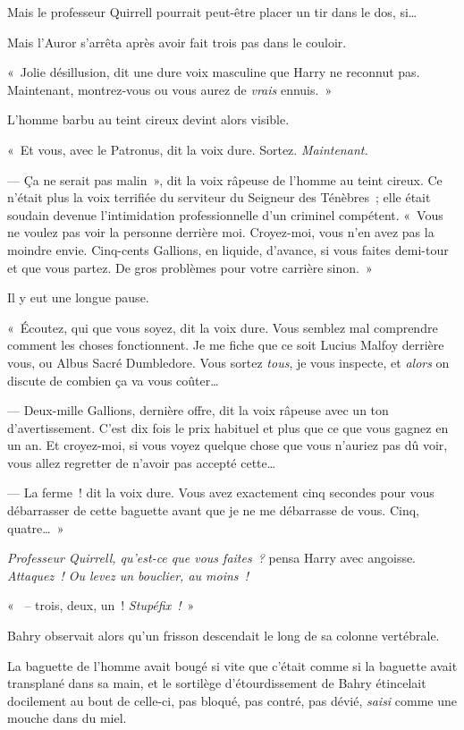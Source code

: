 Mais le professeur Quirrell pourrait peut-être placer un tir dans le dos, si…

Mais l'Auror s'arrêta après avoir fait trois pas dans le couloir.

«~Jolie désillusion, dit une dure voix masculine que Harry ne reconnut pas.
Maintenant, montrez-vous ou vous aurez de \emph{vrais} ennuis.~»

L'homme barbu au teint cireux devint alors visible.

«~Et vous, avec le Patronus, dit la voix dure.
Sortez. \emph{Maintenant.}

--- Ça ne serait pas malin~», dit la voix râpeuse de l'homme au teint cireux.
Ce n'était plus la voix terrifiée du serviteur du Seigneur des Ténèbres~; elle était soudain devenue l'intimidation professionnelle d'un criminel compétent.
«~Vous ne voulez pas voir la personne derrière moi.
Croyez-moi, vous n'en avez pas la moindre envie.
Cinq-cents Gallions, en liquide, d'avance, si vous faites demi-tour et que vous partez.
De gros problèmes pour votre carrière sinon.~»

Il y eut une longue pause.

«~Écoutez, qui que vous soyez, dit la voix dure.
Vous semblez mal comprendre comment les choses fonctionnent.
Je me fiche que ce soit Lucius Malfoy derrière vous, ou Albus Sacré Dumbledore.
Vous sortez \emph{tous}, je vous inspecte, et \emph{alors} on discute de combien ça va vous coûter…

--- Deux-mille Gallions, dernière offre, dit la voix râpeuse avec un ton d'avertissement.
C'est dix fois le prix habituel et plus que ce que vous gagnez en un an.
Et croyez-moi, si vous voyez quelque chose que vous n'auriez pas dû voir, vous allez regretter de n'avoir pas accepté cette…

--- La ferme~! dit la voix dure.
Vous avez exactement cinq secondes pour vous débarrasser de cette baguette avant que je ne me débarrasse de vous.
Cinq, quatre…~»

\emph{Professeur Quirrell, qu'est-ce que vous faites~?} pensa Harry avec angoisse.
\emph{Attaquez~!
Ou levez un bouclier, au moins~!}

«~ -- trois, deux, un~!
\emph{Stupéfix~!}~»

\later

Bahry observait alors qu'un frisson descendait le long de sa colonne vertébrale.

La baguette de l'homme avait bougé si vite que c'était comme si la baguette avait transplané dans sa main, et le sortilège d'étourdissement de Bahry étincelait docilement au bout de celle-ci, pas bloqué, pas contré, pas dévié, \emph{saisi} comme une mouche dans du miel.

